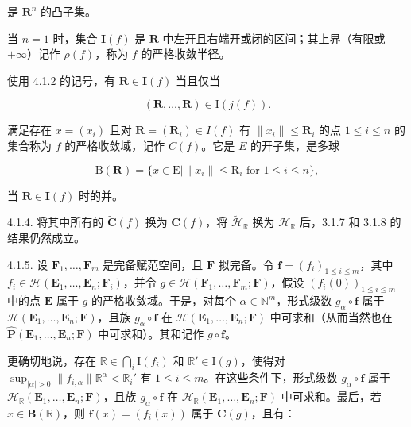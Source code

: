 是 \(\mathbf{R}^{n}\) 的凸子集。

当 \(n=1\) 时，集合 \(\mathbf{I}(f)\) 是 \(\mathbf{R}\) 中左开且右端开或闭的区间；其上界（有限或 \(+\infty\)）记作 \(\rho(f)\)，称为 \(f\) 的严格收敛半径。

使用 4.1.2 的记号，有 \(\mathbf{R} \in \mathbf{I}(f)\) 当且仅当

\[
(\mathbf {R}, \dots , \mathbf {R}) \in \mathrm{I} (j (f)).
\]

满足存在 \(x = (x_i)\) 且对 \(\mathbf{R} = (\mathbf{R}_i) \in I(f)\) 有 \(\| x_i \| \leqslant \mathbf{R}_i\) 的点 \(1 \leqslant i \leqslant n\) 的集合称为 \(f\) 的严格收敛域，记作 \(C(f)\)。它是 \(E\) 的开子集，是多球

\[
\mathrm{B} (\mathbf {R}) = \{x \in \mathrm{E} | \| x _ {i} \| \leqslant \mathrm{R} _ {i} \text {   for   } 1 \leqslant i \leqslant n \},
\]

当 \(\mathbf{R}\in\mathbf{I}(f)\) 时的并。

4.1.4. 将其中所有的 \(\tilde{\mathbf{C}}(f)\) 换为 \(\mathbf{C}(f)\)，将 \(\tilde{\mathcal{H}}_{\mathbb{R}}\) 换为 \(\mathcal{H}_{\mathbb{R}}\) 后，3.1.7 和 3.1.8 的结果仍然成立。

4.1.5. 设 \(\mathbf{F}_1, \ldots, \mathbf{F}_m\) 是完备赋范空间，且 \(\mathbf{F}\) 拟完备。令 \(\mathbf{f} = (f_i)_{1 \leqslant i \leqslant m}\)，其中 \(f_i \in \mathcal{H}(\mathbf{E}_1, \ldots, \mathbf{E}_n; \mathbf{F}_i)\)，并令 \(g \in \mathcal{H}(\mathbf{F}_1, \ldots, \mathbf{F}_m; \mathbf{F})\)，假设 \((f_i(0))_{1 \leqslant i \leqslant m}\) 中的点 \(\mathbf{E}\) 属于 \(g\) 的严格收敛域。于是，对每个 \(\alpha \in \mathbb{N}^m\)，形式级数 \(g_\alpha \circ \mathbf{f}\) 属于 \(\mathcal{H}(\mathbf{E}_1, \ldots, \mathbf{E}_n; \mathbf{F})\)，且族 \(g_\alpha \circ \mathbf{f}\) 在 \(\mathcal{H}(\mathbf{E}_1, \ldots, \mathbf{E}_n; \mathbf{F})\) 中可求和（从而当然也在 \(\hat{\mathbf{P}}(\mathbf{E}_1, \ldots, \mathbf{E}_n; \mathbf{F})\) 中可求和）。其和记作 \(g \circ \mathbf{f}\)。

更确切地说，存在 \(\mathbb{R} \in \bigcap_{i} \mathrm{I}(f_i)\) 和 \(\mathbb{R}' \in \mathrm{I}(g)\)，使得对 \(\sup_{|\alpha| > 0} \| f_{i,\alpha} \| \mathbb{R}^{\alpha} < \mathbb{R}_i'\) 有 \(1 \leqslant i \leqslant m\)。在这些条件下，形式级数 \(g_{\alpha} \circ \mathbf{f}\) 属于 \(\mathcal{H}_{\mathbb{R}}(\mathbf{E}_1, \ldots, \mathbf{E}_n; \mathbf{F})\)，且族 \(g_{\alpha} \circ \mathbf{f}\) 在 \(\mathcal{H}_{\mathbb{R}}(\mathbf{E}_1, \ldots, \mathbf{E}_n; \mathbf{F})\) 中可求和。最后，若 \(x \in \mathbf{B}(\mathbb{R})\)，则 \(\mathbf{f}(x) = (f_i(x))\) 属于 \(\mathbf{C}(g)\)，且有：

